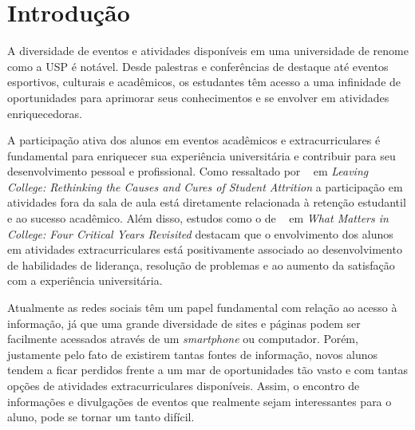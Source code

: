 

\chapter{Introdução}
\label{cap:introducao}

\enlargethispage{.5\baselineskip}

A diversidade de eventos e atividades disponíveis em uma universidade de renome
como a \ac{USP} é notável. Desde palestras e conferências de destaque até
eventos esportivos, culturais e acadêmicos, os estudantes têm acesso a uma
infinidade de oportunidades para aprimorar seus conhecimentos e se envolver em
atividades enriquecedoras.

A participação ativa dos alunos em eventos acadêmicos e extracurriculares é
fundamental para enriquecer sua experiência universitária e contribuir para seu
desenvolvimento pessoal e profissional. Como ressaltado por ~\citet{tinto:12}
em \emph{Leaving College: Rethinking the Causes and Cures of Student Attrition}
a participação em atividades fora da sala de aula está diretamente relacionada
à retenção estudantil e ao sucesso acadêmico. Além disso, estudos como o de
~\citet{astin:97} em \emph{What Matters in College: Four Critical Years
    Revisited} destacam que o envolvimento dos alunos em atividades
extracurriculares está positivamente associado ao desenvolvimento de
habilidades de liderança, resolução de problemas e ao aumento da satisfação com
a experiência universitária.

Atualmente as redes sociais têm um papel fundamental com relação ao acesso à
informação, já que uma grande diversidade de sites e páginas podem ser
facilmente acessados através de um \textit{smartphone} ou computador. Porém,
justamente pelo fato de existirem tantas fontes de informação, novos alunos
tendem a ficar perdidos frente a um mar de oportunidades tão vasto e com tantas
opções de atividades extracurriculares disponíveis. Assim, o encontro de
informações e divulgações de eventos que realmente sejam interessantes para o
aluno, pode se tornar um tanto difícil.

